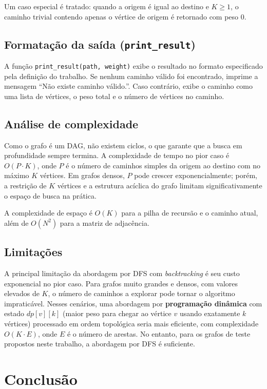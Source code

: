 \documentclass[12pt]{article}
\begin{document}
Um caso especial é tratado: quando a origem é igual ao destino e $K \geq 1$, o caminho trivial contendo apenas o vértice de origem é retornado com peso 0.

\subsection{Formatação da saída (\texttt{print\_result})}

A função \texttt{print\_result(path, weight)} exibe o resultado no formato especificado pela definição do trabalho. Se nenhum caminho válido foi encontrado, imprime a mensagem ``Não existe caminho válido.''. Caso contrário, exibe o caminho como uma lista de vértices, o peso total e o número de vértices no caminho.

\subsection{Análise de complexidade}

Como o grafo é um DAG, não existem ciclos, o que garante que a busca em profundidade sempre termina. A complexidade de tempo no pior caso é $O(P \cdot K)$, onde $P$ é o número de caminhos simples da origem ao destino com no máximo $K$ vértices. Em grafos densos, $P$ pode crescer exponencialmente; porém, a restrição de $K$ vértices e a estrutura acíclica do grafo limitam significativamente o espaço de busca na prática.

A complexidade de espaço é $O(K)$ para a pilha de recursão e o caminho atual, além de $O(N^2)$ para a matriz de adjacência.

\subsection{Limitações}

A principal limitação da abordagem por DFS com \textit{backtracking} é seu custo exponencial no pior caso. Para grafos muito grandes e densos, com valores elevados de $K$, o número de caminhos a explorar pode tornar o algoritmo impraticável. Nesses cenários, uma abordagem por \textbf{programação dinâmica} com estado $dp[v][k]$ (maior peso para chegar ao vértice $v$ usando exatamente $k$ vértices) processado em ordem topológica seria mais eficiente, com complexidade $O(K \cdot E)$, onde $E$ é o número de arestas. No entanto, para os grafos de teste propostos neste trabalho, a abordagem por DFS é suficiente.

\section{Conclusão}
\end{document}
